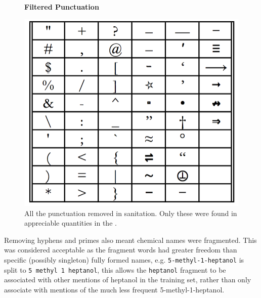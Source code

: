 \begin{figure}[H]
    \centering
    \textbf{Filtered Punctuation }\par\medskip
    \includegraphics[scale=0.2]{Algorithm/punct_table.png}
    \caption[Punctuation removed in sanitation processing]{All the punctuation removed in sanitation. Only these were found in appreciable quantities in the . }
     \label{fig:punct}
\end{figure}
Removing hyphens and primes also meant chemical names were fragmented. This was considered acceptable as the fragment words had greater freedom than specific (possibly singleton) fully formed names, e.g. \texttt{5-methyl-1-heptanol} is split to \texttt{5 methyl 1 heptanol}, this allows the \texttt{heptanol} fragment to be associated with other mentions of heptanol in the training set, rather than only associate with mentions of the much less frequent 5-methyl-1-heptanol. 

